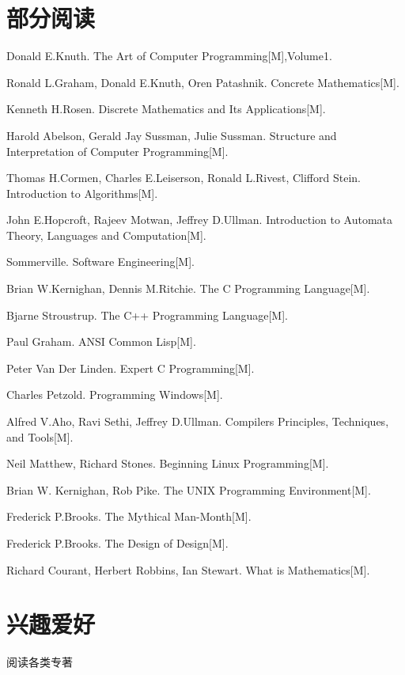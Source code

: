 \documentclass{resumecls}
\begin{document}
\section{部分阅读}
    \noindent
    \begin{list}{[]}{\itemindent=0pt\listparindent=0pt\leftmargin=0pt\rightmargin=18mm}
        \item Donald E.Knuth. The Art of Computer Programming[M],Volume1.
        \item Ronald L.Graham, Donald E.Knuth, Oren Patashnik. Concrete Mathematics[M].
        \item Kenneth H.Rosen. Discrete Mathematics and Its Applications[M].            	
        \item Harold Abelson, Gerald Jay Sussman, Julie Sussman. Structure and Interpretation of Computer Programming[M].
        \item Thomas H.Cormen, Charles E.Leiserson, Ronald L.Rivest, Clifford Stein. Introduction to Algorithms[M].
        \item John E.Hopcroft, Rajeev Motwan, Jeffrey D.Ullman. Introduction to Automata Theory, Languages and Computation[M].
        \item Sommerville. Software Engineering[M].	
        \item Brian W.Kernighan, Dennis M.Ritchie. The C Programming Language[M].	
        \item Bjarne Stroustrup. The C++ Programming Language[M].	
        \item Paul Graham. ANSI Common Lisp[M].
        \item Peter Van Der Linden. Expert C Programming[M].
        \item Charles Petzold. Programming Windows[M].
        \item Alfred V.Aho, Ravi Sethi, Jeffrey D.Ullman. Compilers Principles, Techniques, and Tools[M].
        \item Neil Matthew, Richard Stones. Beginning Linux Programming[M].
        \item Brian W. Kernighan, Rob Pike. The UNIX Programming Environment[M].
        \item Frederick P.Brooks. The Mythical Man-Month[M].
        \item Frederick P.Brooks. The Design of Design[M].
        \item Richard Courant, Herbert Robbins, Ian Stewart. What is Mathematics[M].
    \end{list}
\section{兴趣爱好}
    阅读各类专著
\end{document}

